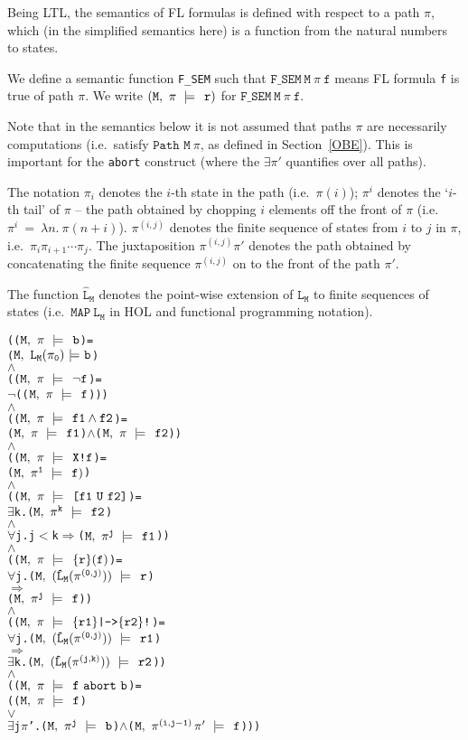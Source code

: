 \documentclass{llncs}
\newcommand{\And}{\(\wedge\)}
\newcommand{\Or}{\(\vee\)}
\newcommand{\Imp}{\(\Rightarrow\)}
\newcommand{\Not}{\(\neg\)}
\newcommand{\Forall}{\(\forall\)}
\newcommand{\Exists}{\(\exists\)}
\newcommand{\pathCat}[2]{#1\hspace*{0.5mm}#2}
\newcommand{\Le}{\(<\)}
\renewcommand{\Pi}{\(\pi\)}
\newcommand{\BSem}[3]{(\(\tt#1,~#2~{\models}~#3\))}
\newcommand{\SSem}[4]{(\(\tt{#1,~#2~\models^{\hspace*{-2.3mm}\raisebox{1mm}{\tt#3}}~#4}\))}
\renewcommand{\c}{{\hspace*{2.5mm}}}
\newcommand{\FSem}[4]{(\(\tt{#1,~#2~\models^{\hspace*{-2.3mm}\raisebox{1mm}{\tt#3}}~#4}\))}
\newcommand{\fSem}[4]{(\tt{#1,~#2~\models^{\hspace*{-2.3mm}\raisebox{1mm}{\tt#3}}~#4})}
\newcommand{\Fsem}{\texttt{F\_SEM}\xspace}
\newcommand{\FBool}[1]{#1}
\newcommand{\fNot}[1]{\neg#1}
\newcommand{\restN}[2]{#1^{#2}}
\newcommand{\pathEl}[2]{#1_{#2}}
\newcommand{\pathSeg}[2]{#1^{#2}}
\newcommand{\lHat}[1]{\hat{\texttt{L}}_{#1}}
\newcommand{\lNoHat}[1]{{\texttt{L}}_{#1}}
\newcommand{\fAnd}[2]{#1 \wedge #2}
\newcommand{\fNext}[1]{\texttt{X!}#1}
\newcommand{\fUntil}[2]{\texttt{[}#1~\texttt{U}~#2\texttt{]}}
\newcommand{\fSuffixImp}[2]{\{#1\}(#2)}
\newcommand{\fStrongImp}[2]{\{#1\}\texttt{|->}\{#2\}\texttt{!}}
\newcommand{\fAbort}[2]{#1~\texttt{abort}~#2}
\newcommand\Hol{HOL\xspace}
\renewcommand{\t}[1]{\texttt{#1}}
\begin{document}
\medskip

Being LTL, the semantics of FL formulas is defined with respect to a path $\pi$,
which (in the simplified semantics here) is a function from the natural numbers to states.

We define a semantic function \Fsem such that $\Fsem~\t{M}~\pi~\t{f}$
means FL formula \t{f} is true of path $\pi$.
We write $\fSem{M}{\pi}{\c}{r}$ for $\Fsem~\t{M}~\pi~\t{f}$.


Note that in the semantics below it is not assumed that paths $\pi$ are necessarily computations
(i.e.~satisfy $\texttt{Path~M}~\pi$, as defined in Section~\ref{OBE}). This is important
for the \t{abort} construct (where the $\exists\pi'$ quantifies over all paths).

The notation $\pi_i$ denotes the $i$-th state in the path (i.e.~$\pi(i)$);
$\pi^i$ denotes the `$i$-th tail' of $\pi$ -- the path obtained
by chopping $i$ elements off the front of $\pi$ (i.e. $\pi^i~=~\lambda n.~\pi(n{+}i)$).
$\pi^{(i,j)}$ denotes the finite sequence of states from $i$ to $j$ in $\pi$,
i.e.~$\pi_i\pi_{i{+}1}\cdots\pi_j$. The juxtaposition
$\pi^{(i,j)}\pi'$ denotes the path obtained by concatenating the finite sequence
$\pi^{(i,j)}$ on to the front of the path $\pi'$. 

The function $\hat{\t{L}}_{\t{M}}$ denotes the point-wise extension of
$\t{L}_{\t{M}}$ to finite sequences of states
(i.e.~$\texttt{MAP}~\t{L}_{\t{M}}$ in \Hol and functional programming notation).



{\begin{alltt}
    ({\FSem{M}{{\pi}}{{\c}}{\FBool{b}}} = 
      {\BSem{M}{\lNoHat{M}(\pathEl{{\pi}}{0})}{b}}
    {\And}
    ({\FSem{M}{{\pi}}{{\c}}{\fNot{f}}} = 
      {\Not}({\FSem{M}{{\pi}}{\c}{f}})) 
    {\And}
    ({\FSem{M}{{\pi}}{{\c}}{\fAnd{f1}{f2}}} = 
      {\FSem{M}{\pi}{{\c}}{f1}} {\And} {\FSem{M}{\pi}{{\c}}{f2}})
    {\And}
    ({\FSem{M}{{\pi}}{{\c}}{\fNext{f}}} = 
      {\FSem{M}{\restN{{\pi}}{1}}{{\c}}{f)}}
    {\And}
    ({\FSem{M}{{\pi}}{{\c}}{\fUntil{f1}{f2}}} = 
      {\Exists}k. {\FSem{M}{\restN{{\pi}}{k}}{\c}{f2}} 
           {\And}
           {\Forall}j. j \Le k \Imp {\FSem{M}{\restN{{\pi}}{j}}{{\c}}{f1}})
    {\And}
    ({\FSem{M}{{\pi}}{{\c}}{\fSuffixImp{r}{f}}} = 
      {\Forall}j. \SSem{M}{(\lHat{M} (\pathSeg{\pi}{(0,j)}))}{\c}{r}
           {\Imp}
           {\FSem{M}{\restN{{\pi}}{j}}{{\c}}{f}})
    {\And}
    ({\FSem{M}{{\pi}}{{\c}}{\fStrongImp{r1}{r2}}} = 
      {\Forall}j. \SSem{M}{(\lHat{M} (\pathSeg{\pi}{(0,j)}))}{\c}{r1}
           {\Imp}
           {\Exists}k. \SSem{M}{(\lHat{M} (\pathSeg{\pi}{(j,k)}))}{\c}{r2})
    {\And}
    ({\FSem{M}{{\pi}}{{\c}}{\fAbort{f}{b}}} =
      ({\FSem{M}{\pi}{{\c}}{f }}
       {\Or}
       {\Exists}j {\Pi}'. {\FSem{M}{\restN{{\pi}}{j}}{\c}{{\FBool{b}}}} {\And} {\FSem{M}{\pathCat{\pathSeg{\pi}{(i,j-1)}}{{\pi}'}}{{\c}}{f}}))
\end{alltt}}
\end{document}
